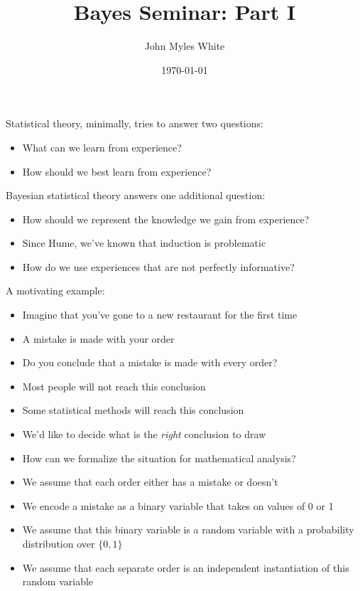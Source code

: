 \documentclass{beamer}
\title{Bayes Seminar: Part I}
\author{John Myles White}
\date{\today}
\begin{document}
\frame{\titlepage}

\frame
{
  Statistical theory, minimally, tries to answer two questions:
  \begin{itemize}
    \item{What can we learn from experience?}
    \item{How should we best learn from experience?}
  \end{itemize}
}

\frame
{
  Bayesian statistical theory answers one additional question:
  \begin{itemize}
    \item{How should we represent the knowledge we gain from experience?}
  \end{itemize}
}

\frame
{
  \begin{itemize}
    \item{Since Hume, we've known that induction is problematic}
    \item{How do we use experiences that are not perfectly informative?}
  \end{itemize}
}

\frame
{
  A motivating example:
  \begin{itemize}
    \item{Imagine that you've gone to a new restaurant for the first time}
    \item{A mistake is made with your order}
    \item{Do you conclude that a mistake is made with every order?}
  \end{itemize}
}

\frame
{
  \begin{itemize}
    \item{Most people will not reach this conclusion}
    \item{Some statistical methods will reach this conclusion}
    \item{We'd like to decide what is the \emph{right} conclusion to draw}
    \item{How can we formalize the situation for mathematical analysis?}
  \end{itemize}
}

\frame
{
  \begin{itemize}
    \item<1->{We assume that each order either has a mistake or doesn't}
    \item<2->{We encode a mistake as a binary variable that takes on values of 0 or 1}
    \item<3->{We assume that this binary variable is a random variable with a probability distribution over $\{0, 1\}$}
    \item<4->{We assume that each separate order is an independent instantiation of this random variable}
  \end{itemize}
}
\end{document}
